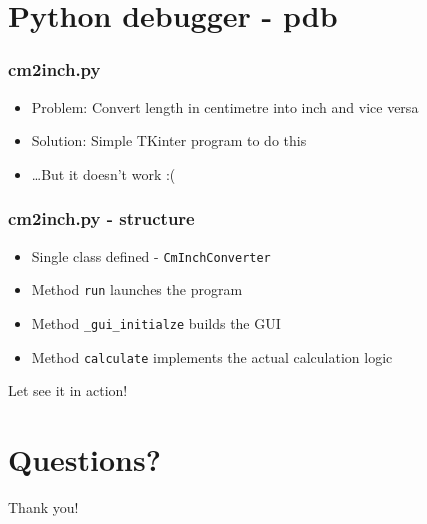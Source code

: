 \documentclass[14pt,notes,svgnames]{beamer}
\begin{document}
\begingroup
    \section{Python debugger - pdb}
\endgroup

\begin{frame}
    \frametitle{cm2inch.py}
    \begin{itemize}
        \item Problem: Convert length in centimetre into inch and vice versa
        \item Solution: Simple TKinter program to do this
        \pause
        \item …But it doesn't work :(
    \end{itemize}
\end{frame}

\begin{frame}
    \frametitle{cm2inch.py - structure}
    \begin{itemize}
        \item Single class defined - \lstinline{CmInchConverter}
        \item Method \lstinline{run} launches the program
        \item Method \lstinline{_gui_initialze} builds the GUI
        \item Method \lstinline{calculate} implements the actual calculation logic
    \end{itemize}
\end{frame}

\begin{frame}
    \centerline{\Large Let see it in action!}
\end{frame}

\begingroup
    \section{Questions?}
\endgroup

\begin{frame}
    \centerline{\Large Thank you!}
\end{frame}
\end{document}
